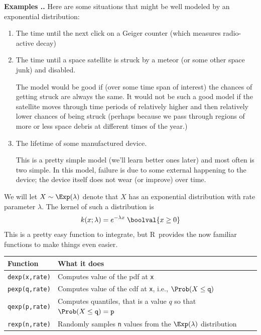 \documentclass[twoside]{book}\usepackage[]{graphicx}\usepackage[]{xcolor}
\def\R{{\sf R}}
\newcounter{example}[section]
\newenvironment{examples}%
{\refstepcounter{example}%
\textbf{Examples \thesection.\arabic{example}. }}%
{}
\begin{document}
\begin{examples}
	Here are some situations that might be well modeled by an exponential distribution:
	\begin{enumerate}
\item
	The time until the next click on a Geiger counter (which measures radio-active
	decay) 

\item
	The time until a space satellite is struck by a meteor (or some other space junk) 
	and disabled.

	The model would be good if (over some time span of interest) the chances of getting
	struck are always the same.  It would not be such a good model if the satellite moves
	through time periods of relatively higher and then relatively lower chances of being
	struck (perhaps because we pass through regions of more or less space debris at 
	different times of the year.)

\item
	The lifetime of some manufactured device.

	This is a pretty simple model (we'll learn better ones later) and most often is two
	simple.  In this model, failure is due to some external happening to the device; the 
	device itself does not wear (or improve) over time.
	\end{enumerate}
\end{examples}

We will let $X \sim \Exp(\lambda)$ denote that $X$ has an exponential distribution
with rate parameter $\lambda$.   
The kernel of such a distribution is 
\[
k(x; \lambda) = e^{-\lambda x} \; \boolval{x \ge 0}
\]
This is a pretty easy function to integrate, but \R\ provides the now familiar
functions to make things even easier.

\begin{center}
\begin{tabular}{ll}
	\hline
	Function & What it does \\
	\hline
	\texttt{dexp(x,rate)} & Computes value of the pdf at \texttt{x}
	\\
	\texttt{pexp(q,rate)}     & Computes value of the cdf at \texttt{x}, i.e., 
	$\Prob(X \le \texttt{q})$
	\\
	\texttt{qexp(p,rate)}     & Computes quantiles, that is a value $q$ so that 
	$\Prob(X \le \texttt{q}) = \texttt{p}$
    \\
	\texttt{rexp(n,rate)} & Randomly samples \texttt{n} values from the 
	$\Exp(\lambda)$ distribution
	\\
	\hline
\end{tabular}
\end{center}
\end{document}
